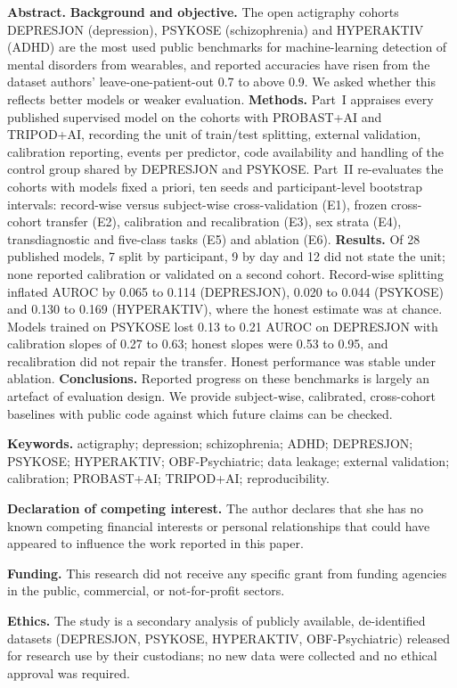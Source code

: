 \documentclass[11pt,a4paper]{article}
\begin{document}
\textbf{Abstract.} \textbf{Background and objective.} The open actigraphy cohorts DEPRESJON (depression), PSYKOSE (schizophrenia) and HYPERAKTIV (ADHD) are the most used public benchmarks for machine-learning detection of mental disorders from wearables, and reported accuracies have risen from the dataset authors' leave-one-patient-out 0.7 to above 0.9. We asked whether this reflects better models or weaker evaluation. \textbf{Methods.} Part~I appraises every published supervised model on the cohorts with PROBAST+AI and TRIPOD+AI, recording the unit of train/test splitting, external validation, calibration reporting, events per predictor, code availability and handling of the control group shared by DEPRESJON and PSYKOSE. Part~II re-evaluates the cohorts with models fixed a priori, ten seeds and participant-level bootstrap intervals: record-wise versus subject-wise cross-validation (E1), frozen cross-cohort transfer (E2), calibration and recalibration (E3), sex strata (E4), transdiagnostic and five-class tasks (E5) and ablation (E6). \textbf{Results.} Of 28 published models, 7 split by participant, 9 by day and 12 did not state the unit; none reported calibration or validated on a second cohort. Record-wise splitting inflated AUROC by 0.065 to 0.114 (DEPRESJON), 0.020 to 0.044 (PSYKOSE) and 0.130 to 0.169 (HYPERAKTIV), where the honest estimate was at chance. Models trained on PSYKOSE lost 0.13 to 0.21 AUROC on DEPRESJON with calibration slopes of 0.27 to 0.63; honest slopes were 0.53 to 0.95, and recalibration did not repair the transfer. Honest performance was stable under ablation. \textbf{Conclusions.} Reported progress on these benchmarks is largely an artefact of evaluation design. We provide subject-wise, calibrated, cross-cohort baselines with public code against which future claims can be checked.

\textbf{Keywords.} actigraphy; depression; schizophrenia; ADHD; DEPRESJON; PSYKOSE; HYPERAKTIV; OBF-Psychiatric; data leakage; external validation; calibration; PROBAST+AI; TRIPOD+AI; reproducibility.

\textbf{Declaration of competing interest.} The author declares that she has no known competing financial interests or personal relationships that could have appeared to influence the work reported in this paper.

\textbf{Funding.} This research did not receive any specific grant from funding agencies in the public, commercial, or not-for-profit sectors.

\textbf{Ethics.} The study is a secondary analysis of publicly available, de-identified datasets (DEPRESJON, PSYKOSE, HYPERAKTIV, OBF-Psychiatric) released for research use by their custodians; no new data were collected and no ethical approval was required.
\end{document}
